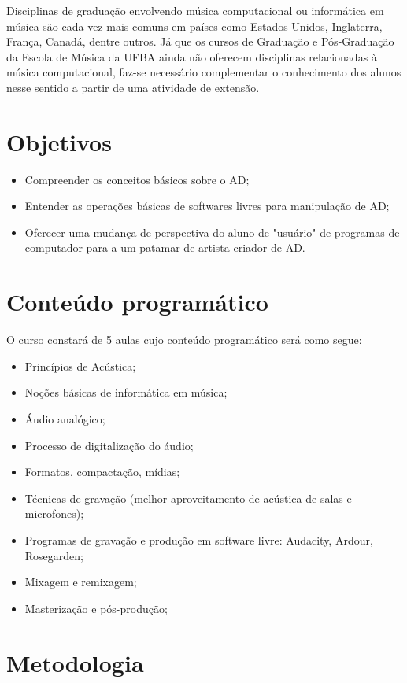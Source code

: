 \documentclass{article}
\begin{document}
Disciplinas de graduação envolvendo música computacional ou
informática em música são cada vez mais comuns em países como Estados
Unidos, Inglaterra, França, Canadá, dentre outros. Já que os cursos de
Graduação e Pós-Graduação da Escola de Música da UFBA ainda não
oferecem disciplinas relacionadas à música computacional, faz-se
necessário complementar o conhecimento dos alunos nesse sentido a
partir de uma atividade de extensão.
		
\section{Objetivos}

\begin{itemize}
\item Compreender os conceitos básicos sobre o AD;
\item Entender as operações básicas de softwares livres para
  manipulação de AD;
\item Oferecer uma mudança de perspectiva do aluno de "usuário" de programas de
  computador para a um patamar de artista criador de AD.
\end{itemize}
\section{Conteúdo programático}

O curso constará de 5 aulas cujo conteúdo programático será como segue:
\begin{itemize}
\item Princípios de Acústica;
\item Noções básicas de informática em música;
\item Áudio analógico;
\item Processo de digitalização do áudio;
\item Formatos, compactação, mídias;
\item Técnicas de gravação (melhor aproveitamento de acústica de salas e microfones);
\item Programas de gravação e produção em software livre: Audacity, Ardour, Rosegarden;
\item Mixagem e remixagem;
\item Masterização e pós-produção;
\end{itemize}

\section{Metodologia}
\end{document}
